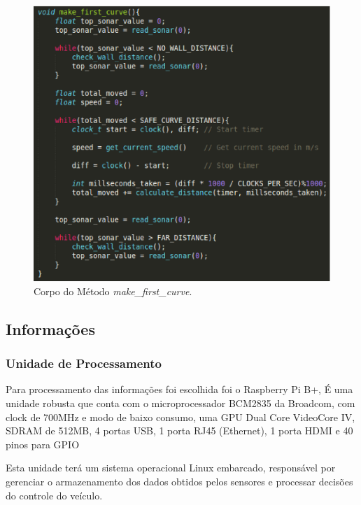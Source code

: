   \begin{figure}[!htbp]
  \begin{center}
  \includegraphics[width=1\textwidth]{figuras/make_first_curve.eps}
  \caption{\label{fig:check_wall_distance}Corpo do Método \textit{make\_first\_curve}.}
  \end{center}
  \end{figure}

  \subsection{Informações}

  \subsubsection{Unidade de Processamento}

  Para processamento das informações foi
  escolhida foi o Raspberry Pi B+,
  É uma unidade robusta que conta com o microprocessador
  BCM2835 da Broadcom, com clock de
  700MHz e modo de baixo consumo, uma GPU Dual Core VideoCore
  IV\textregistered, SDRAM de 512MB, 4 portas USB, 1 porta RJ45
  (Ethernet), 1 porta HDMI e 40 pinos para GPIO~\cite{raspref}

  Esta unidade terá um sistema operacional Linux embarcado, responsável
  por gerenciar o armazenamento dos dados obtidos pelos sensores e
  processar decisões do controle do veículo.

